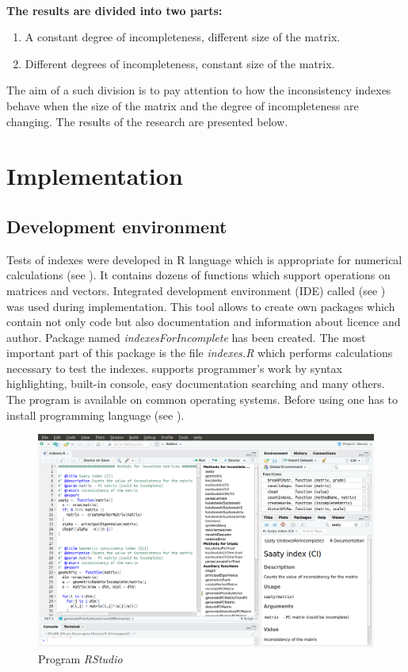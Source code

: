 \\
\textbf{The results are divided into two parts:}
\begin{enumerate}
  \item A constant degree of incompleteness, different size of the matrix.
  \item Different degrees of incompleteness, constant size of the matrix.
\end{enumerate}

The aim of a such division is to pay attention to how the inconsistency indexes behave when the size of the matrix and the degree of incompleteness are changing. The results of the research are presented below.


\section{Implementation}

\subsection{Development environment}
Tests of indexes were developed in R language which is appropriate for numerical calculations (see \cite{projectR}). It contains dozens of functions which support operations on matrices and vectors. Integrated development environment (IDE) called  (see \cite{studioR}) was used during implementation. This tool allows to create own packages which contain not only code but also documentation and information about licence and author. Package named \textit{indexesForIncomplete} has been created. The most important part of this package is the file \textit{indexes.R} which performs calculations necessary to test the indexes.  supports programmer's work by syntax highlighting, built-in console, easy documentation searching and many others. The program is available on common operating systems. Before using  one has to install  programming language (see \cite{installR}).  



\begin{figure}[h]
\centerline{\includegraphics[width=\textwidth]{images/rstudio.png}}
\caption{Program \textit{RStudio}}
\label{fig:rstudio}
\end{figure}

